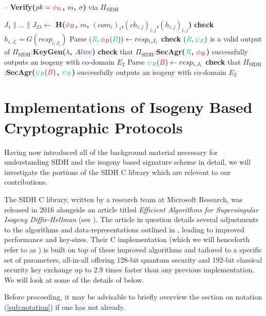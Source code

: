 \begin{algorithm}[H]
\caption{-- \textbf{Verify($pk = \textcolor{red}{\phi_B}$, $m$, $\sigma$)} via $\Pi_{\text{SIDH}}$}\label{euclid}
\begin{algorithmic}[1]
\State $J_{1} \parallel ... \parallel J_{2\lambda} \gets$ \textbf{H($\textcolor{red}{\phi_B}$, $m$, $(com_{i})_{i}$,$(ch_{i,j})_{i,j}$,$(h_{i,j})_{i,j}$)}
	\State \textbf{check} $h_{i,J_{i}} = G(resp_{i,J_{i}})$
		\State Parse $(\textcolor{cyan}{R},\textcolor{red}{\phi_B}(\textcolor{cyan}{R})) \gets resp_{i,J_{i}}$
		\State \textbf{check} $(\textcolor{cyan}{R}, \textcolor{cyan}{\psi_R})$ is a valid output of $\Pi_{\text{SIDH}}$:\textbf{KeyGen($\lambda$, $\textcolor{blue}{Alice}$)}
		\State \textbf{check} that $\Pi_{\text{SIDH}}$:\textbf{SecAgr($\textcolor{cyan}{R}$, $\textcolor{red}{\phi_B}$)} successfully outputs an isogeny with co-domain $E_{2}$
	\Else
		\State Parse $\textcolor{cyan}{\psi_R}(\textcolor{red}{B}) \gets resp_{i,J_{i}}$
		\State \textbf{check} that $\Pi_{\text{SIDH}}$:\textbf{SecAgr($\textcolor{cyan}{\psi_R}(\textcolor{red}{B})$, $\textcolor{cyan}{\psi_R}$)} successfully outputs an isogeny with co-domain $E_{2}$
	\EndIf
\EndFor

	\State {}
\Else
	\State {}
\EndIf
\end{algorithmic}
\end{algorithm}

\section{Implementations of Isogeny Based Cryptographic Protocols}

Having now introduced all of the background material necessary for understanding SIDH and the isogeny based signature scheme in detail, we will investigate the portions of the SIDH C library which are relevent to our contributions.

The SIDH C library, written by a research team at Microsoft Research, was released in 2016 alongside an article titled \emph{Efficient Algorithms for Supersingular Isogeny Diffie-Hellman} (see \cite{effalg}). The article in question details several adjustments to the algorithms and data-representations outlined in \cite{djp}, leading to improved performance and key-sizes. Their C implementation (which we will henceforth refer to as \sidh) is built on top of these improved algorithms and tailored to a specific set of parameters, all-in-all offering 128-bit quantum security and 192-bit classical security key exchange up to 2.9 times faster than any previous implementation. We will look at some of the details of \sidh below. 

Before proceeding, it may be advisable to briefly overview the section on notation (\ref{sub:notation}) if one has not already.

